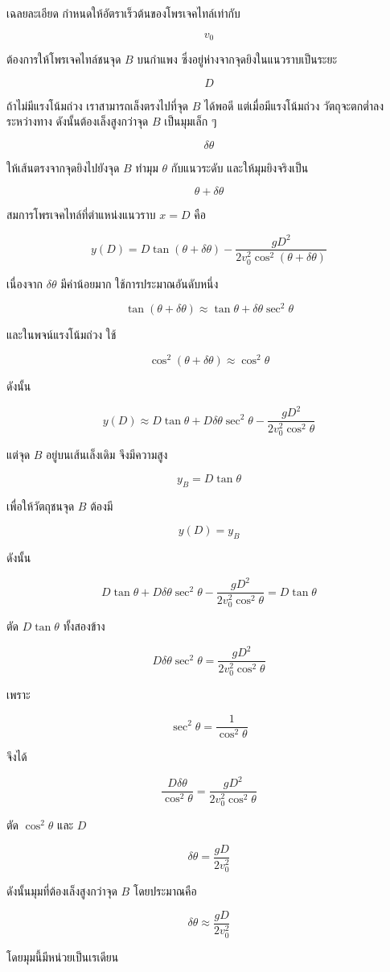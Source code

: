 \begin{examplebox}{เฉลยละเอียด}
กำหนดให้อัตราเร็วต้นของโพรเจคไทล์เท่ากับ

\[
v_0
\]

ต้องการให้โพรเจคไทล์ชนจุด $B$ บนกำแพง ซึ่งอยู่ห่างจากจุดยิงในแนวราบเป็นระยะ

\[
D
\]

ถ้าไม่มีแรงโน้มถ่วง เราสามารถเล็งตรงไปที่จุด $B$ ได้พอดี แต่เมื่อมีแรงโน้มถ่วง วัตถุจะตกต่ำลงระหว่างทาง ดังนั้นต้องเล็งสูงกว่าจุด $B$ เป็นมุมเล็ก ๆ

\[
\delta\theta
\]

ให้เส้นตรงจากจุดยิงไปยังจุด $B$ ทำมุม $\theta$ กับแนวระดับ และให้มุมยิงจริงเป็น

\[
\theta+\delta\theta
\]

สมการโพรเจคไทล์ที่ตำแหน่งแนวราบ $x=D$ คือ

\[
y(D)
=
D\tan(\theta+\delta\theta)
-
\frac{gD^2}{2v_0^2\cos^2(\theta+\delta\theta)}
\]

เนื่องจาก $\delta\theta$ มีค่าน้อยมาก ใช้การประมาณอันดับหนึ่ง

\[
\tan(\theta+\delta\theta)
\approx
\tan\theta+\delta\theta\sec^2\theta
\]

และในพจน์แรงโน้มถ่วง ใช้

\[
\cos^2(\theta+\delta\theta)\approx \cos^2\theta
\]

ดังนั้น

\[
y(D)
\approx
D\tan\theta
+
D\delta\theta\sec^2\theta
-
\frac{gD^2}{2v_0^2\cos^2\theta}
\]

แต่จุด $B$ อยู่บนเส้นเล็งเดิม จึงมีความสูง

\[
y_B=D\tan\theta
\]

เพื่อให้วัตถุชนจุด $B$ ต้องมี

\[
y(D)=y_B
\]

ดังนั้น

\[
D\tan\theta
+
D\delta\theta\sec^2\theta
-
\frac{gD^2}{2v_0^2\cos^2\theta}
=
D\tan\theta
\]

ตัด $D\tan\theta$ ทั้งสองข้าง

\[
D\delta\theta\sec^2\theta
=
\frac{gD^2}{2v_0^2\cos^2\theta}
\]

เพราะ

\[
\sec^2\theta=\frac{1}{\cos^2\theta}
\]

จึงได้

\[
\frac{D\delta\theta}{\cos^2\theta}
=
\frac{gD^2}{2v_0^2\cos^2\theta}
\]

ตัด $\cos^2\theta$ และ $D$

\[
\delta\theta=\frac{gD}{2v_0^2}
\]

ดังนั้นมุมที่ต้องเล็งสูงกว่าจุด $B$ โดยประมาณคือ

\[
\boxed{\delta\theta\approx \frac{gD}{2v_0^2}}
\]

โดยมุมนี้มีหน่วยเป็นเรเดียน
\end{examplebox}

